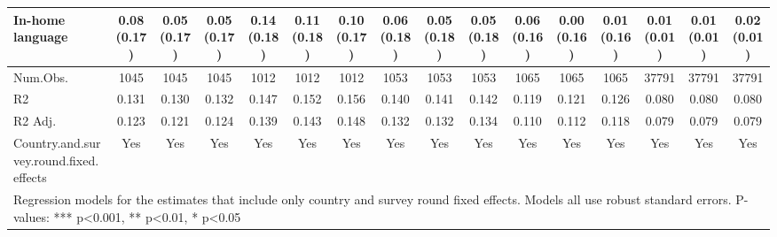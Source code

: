 \begin{table}
\begin{tabular}[t]{lccccccccccccccc}
In-home language & \num{0.08} (\num{0.17}) & \num{0.05} (\num{0.17}) & \num{0.05} (\num{0.17}) & \num{0.14} (\num{0.18}) & \num{0.11} (\num{0.18}) & \num{0.10} (\num{0.17}) & \num{0.06} (\num{0.18}) & \num{0.05} (\num{0.18}) & \num{0.05} (\num{0.18}) & \num{0.06} (\num{0.16}) & \num{0.00} (\num{0.16}) & \num{0.01} (\num{0.16}) & \num{0.01} (\num{0.01}) & \num{0.01} (\num{0.01}) & \num{0.02} (\num{0.01})\\
\midrule
Num.Obs. & \num{1045} & \num{1045} & \num{1045} & \num{1012} & \num{1012} & \num{1012} & \num{1053} & \num{1053} & \num{1053} & \num{1065} & \num{1065} & \num{1065} & \num{37791} & \num{37791} & \num{37791}\\
R2 & \num{0.131} & \num{0.130} & \num{0.132} & \num{0.147} & \num{0.152} & \num{0.156} & \num{0.140} & \num{0.141} & \num{0.142} & \num{0.119} & \num{0.121} & \num{0.126} & \num{0.080} & \num{0.080} & \num{0.080}\\
R2 Adj. & \num{0.123} & \num{0.121} & \num{0.124} & \num{0.139} & \num{0.143} & \num{0.148} & \num{0.132} & \num{0.132} & \num{0.134} & \num{0.110} & \num{0.112} & \num{0.118} & \num{0.079} & \num{0.079} & \num{0.079}\\
Country.and.survey.round.fixed.effects & Yes & Yes & Yes & Yes & Yes & Yes & Yes & Yes & Yes & Yes & Yes & Yes & Yes & Yes & Yes\\
\bottomrule
\multicolumn{16}{l}{\rule{0pt}{1em}Regression models for the estimates that include only country and survey round fixed effects. Models all use robust standard errors. P-values: *** p<0.001, ** p<0.01, * p<0.05}\\
\end{tabular}
\end{table}
